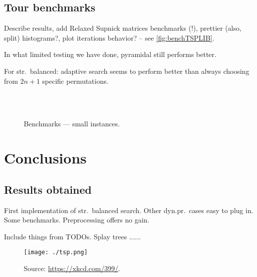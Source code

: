 \documentclass[index=totoc,bibliography=totoc]{scrartcl}
\newcommand{\annotation}[1]{\marginpar{\small\itshape\color{green}#1}}
\numberwithin{equation}{section}
\numberwithin{figure}{section}
\numberwithin{table}{section}
\begin{document}
\subsection{Tour benchmarks}

\annotation{TODO}
Describe results, add Relaxed Supnick matrices benchmarks (!),
prettier (also, split) histograms?, plot iterations behavior? -- see \autoref{fig:benchTSPLIB}.

In what limited testing we have done, pyramidal still performs better.

For str.~balanced: adaptive search seems to perform better
than always choosing from $2n+1$ specific permutations.

\begin{figure}[htbp]
\null\hfill%
\hfill\null\\
\null\hfill%
\hfill\null\\
\null\hfill%
\hfill\null
\caption{Benchmarks --- small instances.}
\label{fig:benchTSPLIB}
\end{figure}

\clearpage

\section{Conclusions}

\subsection{Results obtained}
\annotation{TODO}
First implementation of str.~balanced search.
Other dyn.pr.\ cases easy to plug in.
Some benchmarks.
Preprocessing offers no gain.

Include things from TODOs.
Splay trees ......

\begin{figure}[htbp]
\centering
\texttt{[image: ./tsp.png]}
\caption*{\captionsize Source: \small \url{https://xkcd.com/399/}.}
\end{figure}
\end{document}

